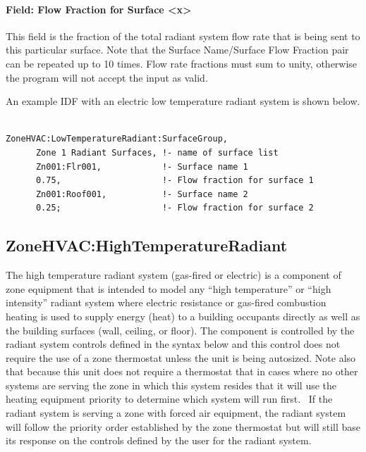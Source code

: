 \paragraph{Field: Flow Fraction for Surface \textless{}x\textgreater{}}\label{field-flow-fraction-for-surface-x}

This field is the fraction of the total radiant system flow rate that is being sent to this particular surface. Note that the Surface Name/Surface Flow Fraction pair can be repeated up to 10 times. Flow rate fractions must sum to unity, otherwise the program will not accept the input as valid.

An example IDF with an electric low temperature radiant system is shown below.

\begin{lstlisting}

ZoneHVAC:LowTemperatureRadiant:SurfaceGroup,
      Zone 1 Radiant Surfaces, !- name of surface list
      Zn001:Flr001,            !- Surface name 1
      0.75,                    !- Flow fraction for surface 1
      Zn001:Roof001,           !- Surface name 2
      0.25;                    !- Flow fraction for surface 2
\end{lstlisting}

\subsection{ZoneHVAC:HighTemperatureRadiant}\label{zonehvachightemperatureradiant}

The high temperature radiant system (gas-fired or electric) is a component of zone equipment that is intended to model any ``high temperature'' or ``high intensity'' radiant system where electric resistance or gas-fired combustion heating is used to supply energy (heat) to a building occupants directly as well as the building surfaces (wall, ceiling, or floor). The component is controlled by the radiant system controls defined in the syntax below and this control does not require the use of a zone thermostat unless the unit is being autosized. Note also that because this unit does not require a thermostat that in cases where no other systems are serving the zone in which this system resides that it will use the heating equipment priority to determine which system will run first.~ If the radiant system is serving a zone with forced air equipment, the radiant system will follow the priority order established by the zone thermostat but will still base its response on the controls defined by the user for the radiant system.

